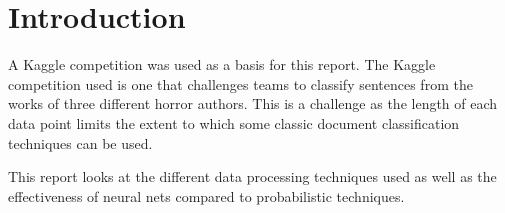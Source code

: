 \section{Introduction}
\label{sec:intro}
A Kaggle competition was used as a basis for this report. The Kaggle competition used is one that challenges teams to classify sentences from the works of three different horror authors. This is a challenge as the length of each data point limits the extent to which some classic document classification techniques can be used. 

This report looks at the different data processing techniques used as well as the effectiveness of neural nets compared to probabilistic techniques.